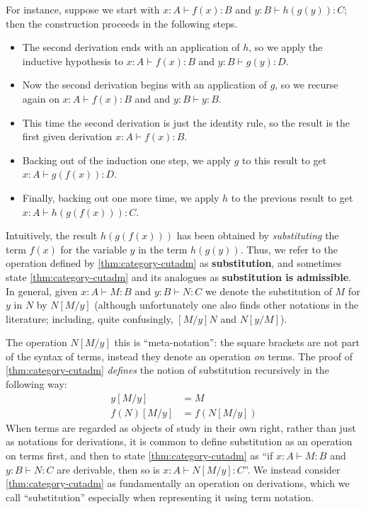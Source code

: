 \documentclass{book}
\let\types\vdash
\begin{document}
For instance, suppose we start with $x:A \types f(x):B$ and $y:B\types h(g(y)):C$; then the construction proceeds in the following steps.
\begin{itemize}
\item The second derivation ends with an application of $h$, so we apply the inductive hypothesis to $x:A \types f(x):B$ and $y:B\types g(y):D$.
\item Now the second derivation begins with an application of $g$, so we recurse again on $x:A \types f(x):B$ and and $y:B\types y:B$.
\item This time the second derivation is just the identity rule, so the result is the first given derivation $x:A \types f(x):B$.
\item Backing out of the induction one step, we apply $g$ to this result to get $x:A\types g(f(x)):D$.
\item Finally, backing out one more time, we apply $h$ to the previous result to get $x:A\types h(g(f(x))):C$.
\end{itemize}
Intuitively, the result $h(g(f(x)))$ has been obtained by \emph{substituting} the term $f(x)$ for the variable $y$ in the term $h(g(y))$.
Thus, we refer to the operation defined by \cref{thm:category-cutadm} as \textbf{substitution}, and sometimes state \cref{thm:category-cutadm} and its analogues as \textbf{substitution is admissible}.
In general, given $x:A\types M:B$ and $y:B\types N:C$ we denote the substitution of $M$ for $y$ in $N$ by $N[M/y]$ (although unfortunately one also finds other notations in the literature; including, quite confusingly, $[M/y]N$ and $N[y/M]$).

The operation $N[M/y]$ this is ``meta-notation'': the square brackets are not part of the syntax of terms, instead they denote an operation \emph{on} terms.
The proof of \cref{thm:category-cutadm} \emph{defines} the notion of substitution recursively in the following way:
\begin{align}
  y[M/y] &= M\label{eq:category-sub-1}\\
  f(N)[M/y] &= f(N[M/y])\label{eq:category-sub-2}
\end{align}
When terms are regarded as objects of study in their own right, rather than just as notations for derivations, it is common to define substitution as an operation on terms first, and then to state \cref{thm:category-cutadm} as ``if $x:A\types M:B$ and $y:B\types N:C$ are derivable, then so is $x:A\types N[M/y]:C$''.
We instead consider \cref{thm:category-cutadm} as fundamentally an operation on derivations, which we call ``substitution'' especially when representing it using term notation.
\end{document}
